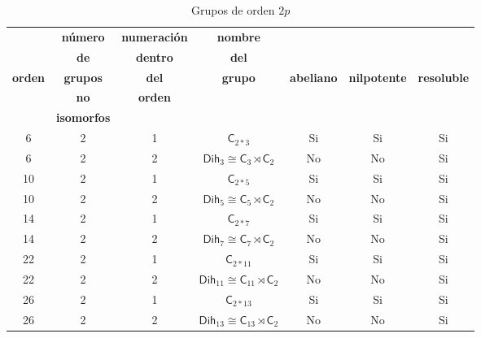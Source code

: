 \documentclass[12pt,a4paper,fleqn,spanish,final,openright]{extbook}
\theoremstyle{definition}
\theoremstyle{remark}
\begin{document}
\begin{table}[h!]
    \begin{center}
        \caption{Grupos de orden $2p$}
        \label{tab:GruposOrden2p}
        \begin{tabular}{c|c|c|c|c|c|c} %
            \textbf{} & \tiny\textbf{número} &\tiny\textbf{numeración} & \tiny\textbf{nombre} & \textbf{} & {} & {} \\
            \textbf{} & \tiny\textbf{de} &\tiny\textbf{dentro} & \tiny\textbf{del} & \tiny\textbf{} & {} & {} \\
            \tiny\textbf{orden} & \tiny\textbf{grupos} & \tiny\textbf{del} & \tiny\textbf{grupo} & \tiny\textbf{abeliano}  & \tiny\textbf{nilpotente} & \tiny\textbf{resoluble} \\
            \textbf{} & \tiny\textbf{no} & \tiny\textbf{orden} & \textbf{} & \textbf{} & {} & {} \\
            \textbf{} & \tiny\textbf{isomorfos} &\textbf{} & \textbf{} & \textbf{} & {} & {} \\
            \hline
            6 & 2 & 1 & ${\textsf{C}}_{2*3}$ & Si & Si & Si \\
            \hline
            6 & 2 & 2  & ${{\textsf{Dih}}_{3}}  \cong  {{\textsf{C}}_{3}}\rtimes{{{\textsf{C}}_{2}}}$ & No & No & Si \\
            \hline
            10 & 2 & 1 & ${\textsf{C}}_{2*5}$ & Si & Si & Si \\
            \hline
            10 & 2 & 2  & ${{\textsf{Dih}}_{5}}  \cong  {{\textsf{C}}_{5}}\rtimes{{{\textsf{C}}_{2}}}$ & No & No & Si \\
            \hline
            14 & 2 & 1 & ${\textsf{C}}_{2*7}$ & Si & Si & Si \\
            \hline
            14 & 2 & 2  & ${{\textsf{Dih}}_{7}}  \cong  {{\textsf{C}}_{7}}\rtimes{{{\textsf{C}}_{2}}}$ & No & No & Si \\
            \hline
            22 & 2 & 1 & ${\textsf{C}}_{2*11}$ & Si & Si & Si \\
            \hline
            22 & 2 & 2  & ${{\textsf{Dih}}_{11}}  \cong  {{\textsf{C}}_{11}}\rtimes{{{\textsf{C}}_{2}}}$ & No & No & Si \\
            \hline
            26 & 2 & 1 & ${\textsf{C}}_{2*13}$ & Si & Si & Si \\
            \hline
            26 & 2 & 2  & ${{\textsf{Dih}}_{13}}  \cong  {{\textsf{C}}_{13}}\rtimes{{{\textsf{C}}_{2}}}$ & No & No & Si \\

\end{tabular}
\end{center}
\end{table}
\end{document}
